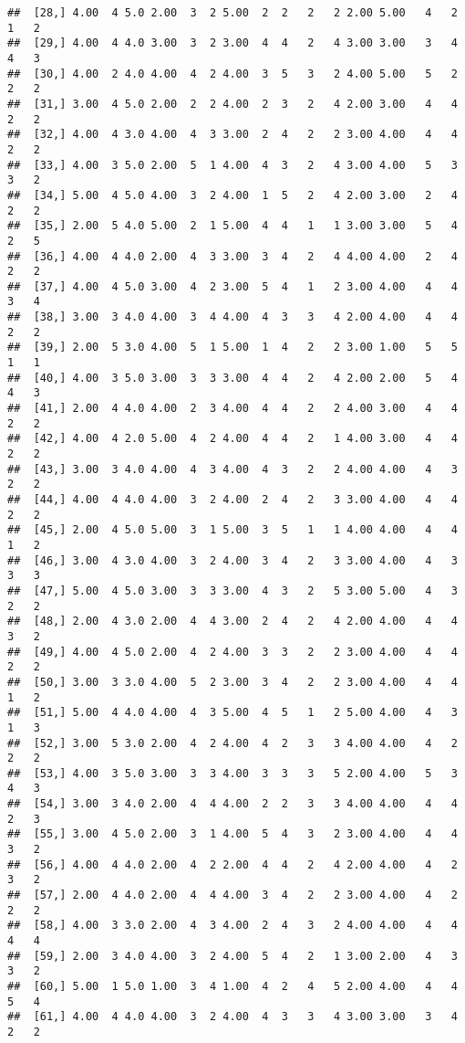 \documentclass[]{article}
\begin{document}
\begin{verbatim}
##  [28,] 4.00  4 5.0 2.00  3  2 5.00  2  2   2   2 2.00 5.00   4   2   1   2
##  [29,] 4.00  4 4.0 3.00  3  2 3.00  4  4   2   4 3.00 3.00   3   4   4   3
##  [30,] 4.00  2 4.0 4.00  4  2 4.00  3  5   3   2 4.00 5.00   5   2   2   2
##  [31,] 3.00  4 5.0 2.00  2  2 4.00  2  3   2   4 2.00 3.00   4   4   2   2
##  [32,] 4.00  4 3.0 4.00  4  3 3.00  2  4   2   2 3.00 4.00   4   4   2   2
##  [33,] 4.00  3 5.0 2.00  5  1 4.00  4  3   2   4 3.00 4.00   5   3   3   2
##  [34,] 5.00  4 5.0 4.00  3  2 4.00  1  5   2   4 2.00 3.00   2   4   2   2
##  [35,] 2.00  5 4.0 5.00  2  1 5.00  4  4   1   1 3.00 3.00   5   4   2   5
##  [36,] 4.00  4 4.0 2.00  4  3 3.00  3  4   2   4 4.00 4.00   2   4   2   2
##  [37,] 4.00  4 5.0 3.00  4  2 3.00  5  4   1   2 3.00 4.00   4   4   3   4
##  [38,] 3.00  3 4.0 4.00  3  4 4.00  4  3   3   4 2.00 4.00   4   4   2   2
##  [39,] 2.00  5 3.0 4.00  5  1 5.00  1  4   2   2 3.00 1.00   5   5   1   1
##  [40,] 4.00  3 5.0 3.00  3  3 3.00  4  4   2   4 2.00 2.00   5   4   4   3
##  [41,] 2.00  4 4.0 4.00  2  3 4.00  4  4   2   2 4.00 3.00   4   4   2   2
##  [42,] 4.00  4 2.0 5.00  4  2 4.00  4  4   2   1 4.00 3.00   4   4   2   2
##  [43,] 3.00  3 4.0 4.00  4  3 4.00  4  3   2   2 4.00 4.00   4   3   2   2
##  [44,] 4.00  4 4.0 4.00  3  2 4.00  2  4   2   3 3.00 4.00   4   4   2   2
##  [45,] 2.00  4 5.0 5.00  3  1 5.00  3  5   1   1 4.00 4.00   4   4   1   2
##  [46,] 3.00  4 3.0 4.00  3  2 4.00  3  4   2   3 3.00 4.00   4   3   3   3
##  [47,] 5.00  4 5.0 3.00  3  3 3.00  4  3   2   5 3.00 5.00   4   3   2   2
##  [48,] 2.00  4 3.0 2.00  4  4 3.00  2  4   2   4 2.00 4.00   4   4   3   2
##  [49,] 4.00  4 5.0 2.00  4  2 4.00  3  3   2   2 3.00 4.00   4   4   2   2
##  [50,] 3.00  3 3.0 4.00  5  2 3.00  3  4   2   2 3.00 4.00   4   4   1   2
##  [51,] 5.00  4 4.0 4.00  4  3 5.00  4  5   1   2 5.00 4.00   4   3   1   3
##  [52,] 3.00  5 3.0 2.00  4  2 4.00  4  2   3   3 4.00 4.00   4   2   2   2
##  [53,] 4.00  3 5.0 3.00  3  3 4.00  3  3   3   5 2.00 4.00   5   3   4   3
##  [54,] 3.00  3 4.0 2.00  4  4 4.00  2  2   3   3 4.00 4.00   4   4   2   3
##  [55,] 3.00  4 5.0 2.00  3  1 4.00  5  4   3   2 3.00 4.00   4   4   3   2
##  [56,] 4.00  4 4.0 2.00  4  2 2.00  4  4   2   4 2.00 4.00   4   2   3   2
##  [57,] 2.00  4 4.0 2.00  4  4 4.00  3  4   2   2 3.00 4.00   4   2   2   2
##  [58,] 4.00  3 3.0 2.00  4  3 4.00  2  4   3   2 4.00 4.00   4   4   4   4
##  [59,] 2.00  3 4.0 4.00  3  2 4.00  5  4   2   1 3.00 2.00   4   3   3   2
##  [60,] 5.00  1 5.0 1.00  3  4 1.00  4  2   4   5 2.00 4.00   4   4   5   4
##  [61,] 4.00  4 4.0 4.00  3  2 4.00  4  3   3   4 3.00 3.00   3   4   2   2

\end{verbatim}
\end{document}
